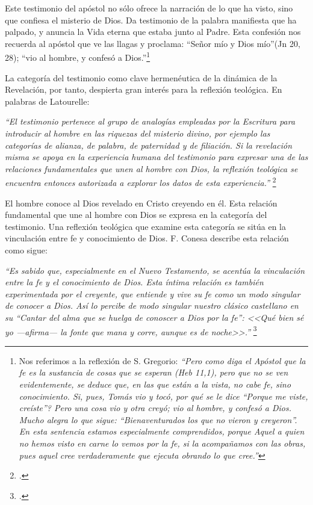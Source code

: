 \documentclass[11pt]{article}
\begin{document}
Este testimonio del apóstol no sólo ofrece la narración de lo que ha visto, sino que confiesa el misterio de Dios. Da testimonio de la palabra manifiesta que ha palpado, y anuncia la Vida eterna que estaba junto al Padre. Esta confesión nos recuerda al apóstol que ve las llagas y proclama: ``Señor mío y Dios mío''(Jn 20, 28); ``vio al hombre, y confesó a Dios.''\footnote{Nos referimos a la reflexión de S. Gregorio: \emph{``Pero como diga el Apóstol que la fe es la sustancia de cosas que se esperan (Heb 11,1), pero que no se ven evidentemente, se deduce que, en las que están a la vista, no cabe fe, sino conocimiento. Si, pues, Tomás vio y tocó, \textquestiondown{}por qué se le dice ``Porque me viste, creíste''? Pero una cosa vio y otra creyó; vio al hombre, y confesó a Dios. Mucho alegra lo que sigue: ``Bienaventurados los que no vieron y creyeron''. En esta sentencia estamos especialmente comprendidos, porque Aquel a quien no hemos visto en carne lo vemos por la fe, si la acompañamos con las obras, pues aquel cree verdaderamente que ejecuta obrando lo que cree.''}\cite[Homilía 26]{greg}
}

La categoría del testimonio como clave hermenéutica de la dinámica de la Revelación, por tanto, despierta gran interés para la reflexión teológica. En palabras de Latourelle:

\emph{
``El testimonio pertenece al grupo de analogías empleadas por la Escritura para introducir al hombre en las riquezas del misterio divino, por ejemplo las categorías de alianza, de palabra, de paternidad y de filiación. Si la revelación misma se apoya en la experiencia humana del testimonio para expresar una de las relaciones fundamentales que unen al hombre con Dios, la reflexión teológica se encuentra entonces autorizada a explorar los datos de esta experiencia.''
}\footcite[1523]{dicctf}

El hombre conoce al Dios revelado en Cristo creyendo en él. Esta relación fundamental que une al hombre con Dios se expresa en la categoría del testimonio. Una reflexión teológica que examine esta categoría se sitúa en la vinculación entre fe y conocimiento de Dios. F. Conesa describe esta relación como sigue:

\emph{
``Es sabido que, especialmente en el Nuevo Testamento, se acentúa la vinculación entre la fe y el conocimiento de Dios. Esta íntima relación es también experimentada por el creyente, que entiende y vive su fe como un modo singular de conocer a Dios. Así lo percibe de modo singular nuestro clásico castellano en su ``Cantar del alma que se huelga de conoscer a Dios por la fe'': <<Qué bien sé yo ---afirma--- la fonte que mana y corre, aunque es de noche>>.''
}\footcite[15]{cyc}
\end{document}
